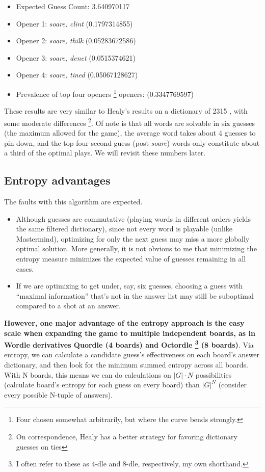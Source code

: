 \documentclass[11pt, oneside]{article} 	%
\begin{document}
\begin{itemize}
\item Expected Guess Count: 3.640970117
\item Opener 1: \emph{soare, clint} (0.1797314855)
\item Opener 2: \emph{soare, thilk} (0.05283672586)
\item Opener 3: \emph{soare, denet} (0.0515374621)
\item Opener 4: \emph{soare, tined} (0.05067128627)
\item Prevalence of top four openers \footnote{Four chosen somewhat arbitrarily, but where the curve bends strongly.} openers: (0.3347769597)
\end{itemize}

These results are very similar to Healy's results on a dictionary of 2315 \cite{1}, with some moderate differences \footnote{On correspondence, Healy has a better strategy for favoring dictionary guesses on ties}. Of note is that all words are solvable in six guesses (the maximum allowed for the game), the average word takes about 4 guesses to pin down, and the top four second guess (post-\emph{soare}) words only constitute about a third of the optimal plays. We will revisit these numbers later.

\subsection{Entropy advantages}

The faults with this algorithm are expected. 
\begin{itemize}
\item Although guesses are commutative (playing words in different orders yields the same filtered dictionary), since not every word is playable (unlike Mastermind), optimizing for only the next guess may miss a more globally optimal solution. More generally, it is not obvious to me that minimizing the entropy measure minimizes the expected value of guesses remaining in all cases. 
\item If we are optimizing to get under, say, six guesses, choosing a guess with ``maximal information'' that's not in the answer list may still be suboptimal compared to a shot at an answer.
\end{itemize}

\textbf{However, one major advantage of the entropy approach is the easy scale when expanding the game to multiple independent boards, as in Wordle derivatives Quordle (4 boards) and Octordle \footnote{I often refer to these as 4-dle and 8-dle, respectively, my own shorthand.} (8 boards)}. Via entropy, we can calculate a candidate guess's effectiveness on each board's answer dictionary, and then look for the minimum summed entropy across all boards. With N boards, this means we can do calculations on $|G|\cdot N$ possibilities (calculate board's entropy for each guess on every board) than $|G|^N$ (consider every possible N-tuple of answers).
\end{document}
